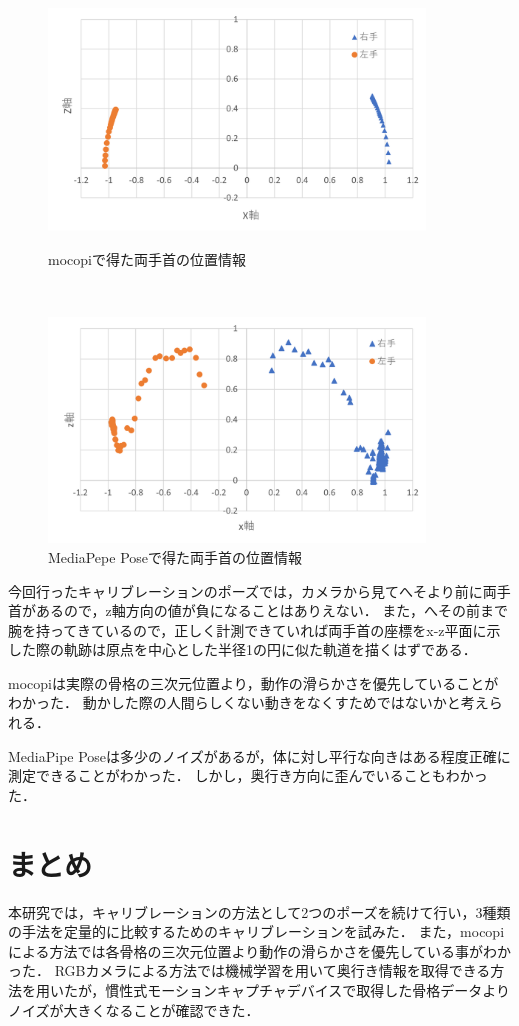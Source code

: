 \documentclass[a4j, fleqn, 12pt]{jsreport}
\begin{document}
\begin{figure}[h]
  \centering
  \begin{minipage}{10cm}
    \centering
    \includegraphics[width=10cm]{img/1_mocopi.png}
    \caption{mocopiで得た両手首の位置情報}
    \label{fig:1_mocopi}
  \end{minipage}\\
  \begin{minipage}{10cm}
    \centering
    \includegraphics[width=10cm]{img/1_media.png}
    \caption{MediaPepe Poseで得た両手首の位置情報}
    \label{fig:1_media}
  \end{minipage}
\end{figure}
今回行ったキャリブレーションのポーズでは，カメラから見てへそより前に両手首があるので，z軸方向の値が負になることはありえない．
また，へその前まで腕を持ってきているので，正しく計測できていれば両手首の座標をx-z平面に示した際の軌跡は原点を中心とした半径1の円に似た軌道を描くはずである．

mocopiは実際の骨格の三次元位置より，動作の滑らかさを優先していることがわかった．
動かした際の人間らしくない動きをなくすためではないかと考えられる．

MediaPipe Poseは多少のノイズがあるが，体に対し平行な向きはある程度正確に測定できることがわかった．
しかし，奥行き方向に歪んでいることもわかった．
\chapter{まとめ}
本研究では，キャリブレーションの方法として2つのポーズを続けて行い，3種類の手法を定量的に比較するためのキャリブレーションを試みた．
また，mocopiによる方法では各骨格の三次元位置より動作の滑らかさを優先している事がわかった．
RGBカメラによる方法では機械学習を用いて奥行き情報を取得できる方法を用いたが，慣性式モーションキャプチャデバイスで取得した骨格データよりノイズが大きくなることが確認できた．
\end{document}
